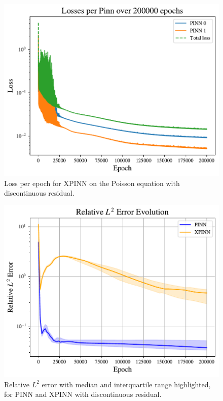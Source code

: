 \begin{figure}[h]
    \centering
    \includegraphics[width=0.9\linewidth]{Project1XPINNs/figures/Poisson/new_exp/discrete_xpinn_Poisson_losses.pdf}
    \caption{Loss per epoch for XPINN on the Poisson equation with discontinuous residual.}
    \label{fig:xpinn_disc_loss}
\end{figure}
\begin{figure}[h!]
    \centering
    \includegraphics[width = 0.9\linewidth]{Project1XPINNs/figures/Poisson/discrete_l2_error_evolution.pdf}
    \caption{Relative $L^2$ error with median and interquartile range highlighted, for PINN and XPINN with discontinuous residual.}
    \label{fig:rel_l2_discrete_poisson}
\end{figure}
\vfill\null


